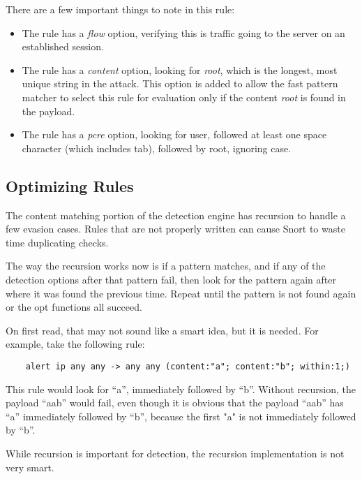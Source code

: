 \documentclass[english]{report}
\begin{document}
There are a few important things to note in this rule:

\begin{itemize}

\item The rule has a \emph{flow} option, verifying this is traffic going to the
server on an established session.

\item The rule has a \emph{content} option, looking for \emph{root}, which is
the longest, most unique string in the attack.  This option is added to allow
the fast pattern matcher to select this rule for evaluation only if the
content \emph{root} is found in the payload.

\item The rule has a \emph{pcre} option, looking for user, followed at least
one space character (which includes tab), followed by root, ignoring case.

\end{itemize}

\subsection{Optimizing Rules}

The content matching portion of the detection engine has recursion to handle a
few evasion cases.  Rules that are not properly written can cause Snort to
waste time duplicating checks.

The way the recursion works now is if a pattern matches, and if any of the
detection options after that pattern fail, then look for the pattern again
after where it was found the previous time.  Repeat until the pattern is not
found again or the opt functions all succeed.

On first read, that may not sound like a smart idea, but it is needed.  For
example, take the following rule:

\begin{verbatim}
    alert ip any any -> any any (content:"a"; content:"b"; within:1;)
\end{verbatim}

This rule would look for ``a'', immediately followed by ``b''.  Without
recursion, the payload ``aab'' would fail, even though it is obvious that the
payload ``aab'' has ``a'' immediately followed by ``b'', because the first "a"
is not immediately followed by ``b''.

While recursion is important for detection, the recursion implementation is not
very smart.
\end{document}
